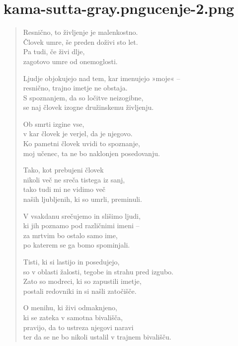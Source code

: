 
\chapter[Jarā Sutta]{{kama-sutta-gray.png}{ucenje-2.png}}


\begin{verse}


Resnično, to življenje je malenkostno.\\
Človek umre, še preden doživi sto let.\\
Pa tudi, če živi dlje,\\
zagotovo umre od onemoglosti.

Ljudje objokujejo nad tem, kar imenujejo »moje« --\\
resnično, trajno imetje ne obstaja.\\
S spoznanjem, da so ločitve neizogibne,\\
se naj človek izogne družinskemu življenju.

Ob smrti izgine vse,\\
v kar človek je verjel, da je njegovo.\\
Ko pametni človek uvidi to spoznanje,\\
moj učenec, ta ne bo naklonjen posedovanju.

Tako, kot prebujeni človek\\
nikoli več ne sreča tistega iz sanj,\\
tako tudi mi ne vidimo več\\
naših ljubljenih, ki so umrli, preminuli.

V vsakdanu srečujemo in slišimo ljudi,\\
ki jih poznamo pod različnimi imeni --\\
za mrtvim bo ostalo samo ime,\\
po katerem se ga bomo spominjali.

Tisti, ki si lastijo in posedujejo,\\
so v oblasti žalosti, tegobe in strahu pred izgubo.\\
Zato so modreci, ki so zapustili imetje,\\
postali redovniki in si našli zatočišče.

O menihu, ki živi odmaknjeno,\\
ki se zateka v samotna bivališča,\\
pravijo, da to ustreza njegovi naravi\\
ter da se ne bo nikoli ustalil v trajnem bivališču.


\end{verse}
